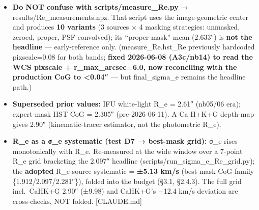 \documentclass[
]{article}
\providecommand{\tightlist}{%
  \setlength{\itemsep}{0pt}\setlength{\parskip}{0pt}}
\newcommand{\BreakablePath}[1]{{\ttfamily\sloppy #1}}
\begin{document}
\begin{itemize}
  \begin{itemize}
  \tightlist
  \item
    best-mask F140W CoG = \textbf{1.912″}; F200LP CoG = \textbf{2.281″};
    mean = \textbf{2.097″} (expert-mask values were 2.168/2.441/2.305).
  \item
    Masked CoG zeros mask-flagged HST pixels before the radial flux
    integral, so the lensed arc / companions do not bias the half-light
    point.
  \item
    Centers: HST-mean
    \BreakablePath{photutils.\discretionary{}{}{}centroid\_\discretionary{}{}{}2dg}
    centers (same as the σ\_e pipeline), both bands.
  \end{itemize}
\item
  \textbf{Do NOT confuse with
  \BreakablePath{scripts/\discretionary{}{}{}measure\_\discretionary{}{}{}Re.\discretionary{}{}{}py}}
  →
  \BreakablePath{results/\discretionary{}{}{}Re\_\discretionary{}{}{}measurements.\discretionary{}{}{}npz}.
  That script uses the image-geometric center and produces \textbf{10
  variants} (3 sources × 4 masking strategies: \BreakablePath{unmasked},
  \BreakablePath{zeroed}, \BreakablePath{proper},
  \BreakablePath{PSF-\discretionary{}{}{}convolved}); its
  ``proper-mask'' mean (2.633″) is \textbf{not the headline} ---
  early-reference only.
  (\BreakablePath{measure\_\discretionary{}{}{}Re.\discretionary{}{}{}hst\_\discretionary{}{}{}Re}
  previously hardcoded pixscale=0.08 for both bands; \textbf{fixed
  2026-06-08 (A3c/nb14) to read the WCS pixscale +
  \BreakablePath{r\_\discretionary{}{}{}max\_\discretionary{}{}{}arcsec=6.\discretionary{}{}{}0},
  now reconciling with the production CoG to \textless0.04″} --- but
  \BreakablePath{final\_\discretionary{}{}{}sigma\_\discretionary{}{}{}e}
  remains the headline path.)
\item
  \textbf{Superseded prior values:} IFU white-light R\_e = 2.61″
  (nb05/06 era); expert-mask HST CoG = 2.305″ (pre-2026-06-11). A Ca
  H+K+G depth-map gives 2.90″ (kinematic-tracer estimator, not the
  photometric R\_e).
\item
  \textbf{R\_e as a σ\_e systematic (test D7 → best-mask grid):} σ\_e
  rises monotonically with R\_e. Re-measured at the wide window over a
  7-point R\_e grid bracketing the 2.097″ headline
  (\BreakablePath{scripts/\discretionary{}{}{}run\_\discretionary{}{}{}sigma\_\discretionary{}{}{}e\_\discretionary{}{}{}Re\_\discretionary{}{}{}grid.\discretionary{}{}{}py});
  the \textbf{adopted} R\_e-source systematic = \textbf{±5.13 km/s}
  (best-mask CoG family \{1.912/2.097/2.281″\}), folded into the budget
  (§3.1, §2.4.3). The full grid incl.~CaHK+G 2.90″ (±9.98) and CaHK+G's
  +12.4 km/s deviation are cross-checks, NOT folded. {[}CLAUDE.md{]}
\end{itemize}
\end{document}
